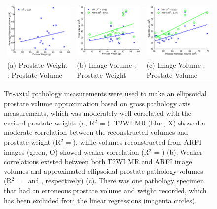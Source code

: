 \begin{figure}
\centering
\begin{small}
\begin{tabular}{lll}
\includegraphics[width=0.3\linewidth]{figs/corr_path_vol_weight_vol} &
\includegraphics[width=0.3\linewidth]{figs/corr_weight_vol} &
\includegraphics[width=0.3\linewidth]{figs/corr_pathVol_vol} \\
(a) Prostate Weight : Prostate Volume & (b) Image Volume : Prostate Weight & (c) Image Volume : Prostate Volume \\
\end{tabular}
\end{small}
\caption{Tri-axial pathology measurements were used to make an ellipsoidal
    prostate volume approximation based on gross pathology axis measurements,
    which was moderately well-correlated with the excised prostate weights (a,
    R$^2$ = \pathVolWeightRsq).  T2WI MR (blue, X) showed a moderate
    correlation between the reconstructed volumes and prostate weight (R$^2$ =
    \weightMRrsq), while volumes reconstructed from ARFI images (green, O)
    showed weaker correlation (R$^2$ = \weightARFIrsq) (b).  Weaker
    correlations existed between both T2WI MR and ARFI image volumes and
    approximated ellipsoidal prostate pathology volumes (R$^2$ =
    \pathVolMRrsq~and \pathVolARFIrsq, respectively) (c).  There was one
    pathology specimen that had an erroneous prostate volume and weight
    recorded, which has been excluded from the linear regressions (magenta
    circles).}
\label{fig:mr_arfi_weight}
\end{figure}
